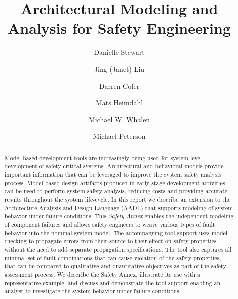 \documentclass{article}
\begin{document}
\newcommand{\stateequiv}{\equiv_{s}}
\newcommand{\traceequiv}{\equiv_{\sigma}}
\newcommand{\ta}{\text{TA}}
\newcommand{\cta}{\text{TA$_{C}$}}
\newcommand{\tta}{\text{TA$_{T}$}}
\newcommand{\ucalg}{\texttt{\small{IVC\_UC}}}
\newcommand{\ucbfalg}{\texttt{\small{IVC\_UCBF}}}


%
\title{Architectural Modeling and Analysis for Safety Engineering}
\author[1]{Danielle Stewart}
\author[2]{Jing (Janet) Liu}
\author[2]{Darren Cofer}
\author[1]{Mats Heimdahl}
\author[1]{Michael W. Whalen}
\author[3]{Michael Peterson}
\setcounter{Maxaffil}{0}
\renewcommand\Affilfont{\itshape\small}
\maketitle
\newpage
\tableofcontents
\newpage
\listoffigures
\listoftables
\listofalgorithms
\newpage

\begin{abstract}
Model-based development tools are increasingly being used 
for system-level development of safety-critical systems. Architectural 
and behavioral models  provide important information 
that can be leveraged to improve the system
safety analysis process. Model-based design artifacts 
produced in early stage development activities can be used to perform system safety analysis,
reducing costs and providing accurate results throughout
the system life-cycle. In this report we describe an extension 
to the Architecture Analysis and Design Language (AADL) that 
supports modeling of system behavior under failure conditions. This 
\emph{Safety Annex} enables the independent modeling of component 
failures and allows safety engineers to weave various types of 
fault behavior into the nominal system model. The accompanying tool support 
uses model checking to propagate errors from their source to
 their effect on %
 safety properties without the need to add 
separate propagation specifications. %
The tool also captures all minimal set of fault combinations that can cause violation of the safety properties, that can be compared to qualitative and quantitative objectives as part of the safety assessment process.
We describe the Safety Annex, illustrate its use with a representative 
example, and discuss and demonstrate the tool support enabling an 
analyst to investigate the system behavior under failure conditions.	

\end{abstract}
\end{document}
